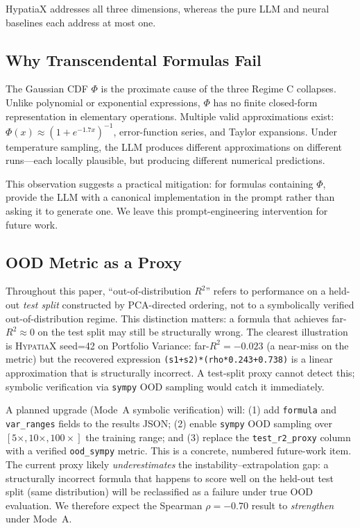 \documentclass[twoside,11pt]{article}
\newcommand{\Rsq}{R^{2}}
\begin{document}
HypatiaX addresses all three dimensions, whereas the pure LLM and neural baselines
each address at most one.

\subsection{Why Transcendental Formulas Fail}\label{subsec:why-transcendental-formulas-fail}
\label{sec:disc_transcendental}

The Gaussian CDF $\Phi$ is the proximate cause of the three Regime C collapses.
Unlike polynomial or exponential expressions, $\Phi$ has no finite closed-form
representation in elementary operations.  Multiple valid approximations exist:
$\Phi(x) \approx (1 + e^{-1.7x})^{-1}$, error-function series, and Taylor
expansions.  Under temperature sampling, the LLM produces different approximations
on different runs---each locally plausible, but producing different numerical
predictions.

This observation suggests a practical mitigation: for formulas containing $\Phi$,
provide the LLM with a canonical implementation in the prompt rather than asking it
to generate one.  We leave this prompt-engineering intervention for future work.

\subsection{OOD Metric as a Proxy}\label{subsec:ood-metric-as-a-proxy}
\label{sec:ood_proxy}

Throughout this paper, ``out-of-distribution $\Rsq$'' refers to performance on a
held-out \emph{test split} constructed by PCA-directed ordering, not to a
symbolically verified out-of-distribution regime.  This distinction matters: a
formula that achieves far-$\Rsq \approx 0$ on the test split may still be
structurally wrong.  The clearest illustration is \textsc{HypatiaX} seed=42 on
Portfolio Variance: far-$\Rsq = -0.023$ (a near-miss on the metric) but the
recovered expression \texttt{(s1+s2)*(rho*0.243+0.738)} is a linear approximation
that is structurally incorrect.  A test-split proxy cannot detect this; symbolic
verification via \texttt{sympy} OOD sampling would catch it immediately.

A planned upgrade (Mode~A symbolic verification) will: (1) add \texttt{formula} and
\texttt{var\_ranges} fields to the results JSON; (2) enable \texttt{sympy} OOD
sampling over $[5\times, 10\times, 100\times]$ the training range; and (3) replace
the \texttt{test\_r2\_proxy} column with a verified \texttt{ood\_sympy} metric.
This is a concrete, numbered future-work item.  The current proxy likely
\emph{underestimates} the instability--extrapolation gap: a structurally incorrect
formula that happens to score well on the held-out test split (same distribution)
will be reclassified as a failure under true OOD evaluation.  We therefore
expect the Spearman $\rho=-0.70$ result to \emph{strengthen} under Mode~A.
\end{document}
